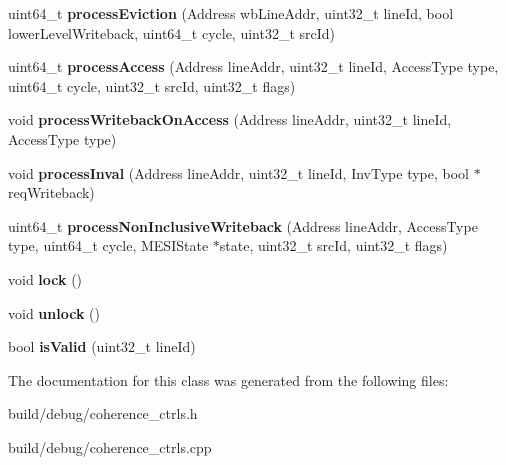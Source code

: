 \begin{DoxyCompactItemize}
\item 
\hypertarget{classMESIBottomCC_a7dc49733453e94f27a5b6980dae9ee32}{uint64\-\_\-t {\bfseries process\-Eviction} (Address wb\-Line\-Addr, uint32\-\_\-t line\-Id, bool lower\-Level\-Writeback, uint64\-\_\-t cycle, uint32\-\_\-t src\-Id)}\label{classMESIBottomCC_a7dc49733453e94f27a5b6980dae9ee32}

\item 
\hypertarget{classMESIBottomCC_af5b441412de0c68edc20b96a1578f81d}{uint64\-\_\-t {\bfseries process\-Access} (Address line\-Addr, uint32\-\_\-t line\-Id, Access\-Type type, uint64\-\_\-t cycle, uint32\-\_\-t src\-Id, uint32\-\_\-t flags)}\label{classMESIBottomCC_af5b441412de0c68edc20b96a1578f81d}

\item 
\hypertarget{classMESIBottomCC_a79fa9cb767d5aff31fabf2c0c9b698a3}{void {\bfseries process\-Writeback\-On\-Access} (Address line\-Addr, uint32\-\_\-t line\-Id, Access\-Type type)}\label{classMESIBottomCC_a79fa9cb767d5aff31fabf2c0c9b698a3}

\item 
\hypertarget{classMESIBottomCC_abf24d8aff75aeef0d89e90e6006adbe7}{void {\bfseries process\-Inval} (Address line\-Addr, uint32\-\_\-t line\-Id, Inv\-Type type, bool $\ast$req\-Writeback)}\label{classMESIBottomCC_abf24d8aff75aeef0d89e90e6006adbe7}

\item 
\hypertarget{classMESIBottomCC_ac2b2916af63b5fb75e24b5659c54e1fd}{uint64\-\_\-t {\bfseries process\-Non\-Inclusive\-Writeback} (Address line\-Addr, Access\-Type type, uint64\-\_\-t cycle, M\-E\-S\-I\-State $\ast$state, uint32\-\_\-t src\-Id, uint32\-\_\-t flags)}\label{classMESIBottomCC_ac2b2916af63b5fb75e24b5659c54e1fd}

\item 
\hypertarget{classMESIBottomCC_a08911f3e7f3f4d1b84532a06186cdb57}{void {\bfseries lock} ()}\label{classMESIBottomCC_a08911f3e7f3f4d1b84532a06186cdb57}

\item 
\hypertarget{classMESIBottomCC_aed3169349f616a6f662c1698e0ef4956}{void {\bfseries unlock} ()}\label{classMESIBottomCC_aed3169349f616a6f662c1698e0ef4956}

\item 
\hypertarget{classMESIBottomCC_aa88f5fe706c2754c4a52b5ded557209e}{bool {\bfseries is\-Valid} (uint32\-\_\-t line\-Id)}\label{classMESIBottomCC_aa88f5fe706c2754c4a52b5ded557209e}

\end{DoxyCompactItemize}


The documentation for this class was generated from the following files\-:\begin{DoxyCompactItemize}
\item 
build/debug/coherence\-\_\-ctrls.\-h\item 
build/debug/coherence\-\_\-ctrls.\-cpp\end{DoxyCompactItemize}
